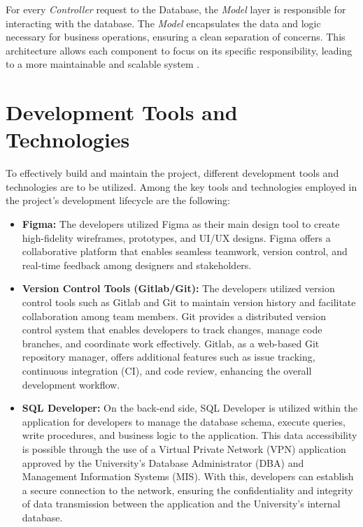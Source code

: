     For every \textit{Controller} request to the Database, the \textit{Model} layer is responsible for interacting with the database. The \textit{Model} encapsulates the data and logic necessary for business operations, ensuring a clean separation of concerns. This architecture allows each component to focus on its specific responsibility, leading to a more maintainable and scalable system \cite{mdn12023} \cite{wikipedia12024}. 

\section{Development Tools and Technologies}

    To effectively build and maintain the project, different development tools and technologies are to be utilized. Among the key tools and technologies employed in the project's development lifecycle are the following:

    \begin{itemize}
        \item[] \textbf{Figma:} The developers utilized Figma as their main design tool to create high-fidelity wireframes, prototypes, and UI/UX designs. Figma offers a collaborative platform that enables seamless teamwork, version control, and real-time feedback among designers and stakeholders. 
        \item[] \textbf{Version Control Tools (Gitlab/Git):} The developers utilized version control tools such as Gitlab and Git to maintain version history and facilitate collaboration among team members. Git provides a distributed version control system that enables developers to track changes, manage code branches, and coordinate work effectively. Gitlab, as a web-based Git repository manager, offers additional features such as issue tracking, continuous integration (CI), and code review, enhancing the overall development workflow.
        \item[] \textbf{SQL Developer:} On the back-end side, SQL Developer is utilized within the application for developers to manage the database schema, execute queries, write procedures, and business logic to the application. This data accessibility is possible through the use of a Virtual Private Network (VPN) application approved by the University's Database Administrator (DBA) and Management Information Systems (MIS). With this, developers can establish a secure connection to the network, ensuring the confidentiality and integrity of data transmission between the application and the University's internal database.
    \end{itemize}

